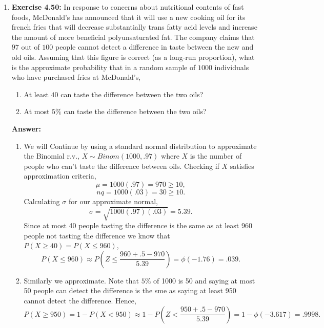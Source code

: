 \documentclass[12pt]{article}
\theoremstyle{homework}
\begin{document}
\begin{enumerate}
\item\hspace{.5in}\textbf{Exercise 4.50:} In response to concerns about nutritional contents of fast foods, McDonald’s has announced that it will use a new cooking oil for its french fries that will decrease substantially trans fatty acid levels and increase the amount of more beneficial polyunsaturated fat. The company claims that $97$ out of $100$ people cannot detect a difference in taste between the new and old oils. Assuming that this figure is correct (as a long-run proportion), what is the approximate probability that in a random sample of $1000$ individuals who have purchased fries at McDonald’s,
\begin{enumerate}
\item At least $40$ can taste the difference between the two oils?
\item At most $5\%$ can taste the difference between the two oils?
\end{enumerate}
\textbf{Answer:} 
\begin{enumerate}
\item We will Continue by using a standard normal distribution to approximate the Binomial r.v., $X \sim Binom(1000, .97)$ where $X$ is the number of people who can't taste the difference between oils. 
Checking if $X$ satisfies approximation criteria,
\begin{equation*}
  \mu = 1000(.97) = 970 \geq 10, 
\end{equation*}
\begin{equation*}
  nq = 1000(.03) = 30 \geq 10 .
\end{equation*}
Calculating $\sigma$ for our approximate normal,
\begin{equation*}
  \sigma = \sqrt{1000(.97)(.03)} = 5.39.
\end{equation*}
Since at most 40 people tasting the difference is the same as at least 960 people not tasting the difference we know that $P(X\geq 40) = P(X \le 960)$,
\begin{equation*}
  P(X \le 960) \approx P(Z \le \frac{960 + .5 - 970}{5.39}) = \phi(-1.76) = .039.
\end{equation*}
\item Similarly we approximate. Note that $5\%$ of 1000 is 50 and saying at most 50 people can detect the difference is the sme as saying at least 950 cannot detect the difference. Hence,
\begin{equation*}
  P(X \geq 950) = 1 - P(X < 950) \approx 1 - P(Z < \dfrac{950 + .5 - 970}{5.39}) = 1 - \phi(-3.617) = .9998.
\end{equation*}
\end{enumerate}
\vspace{.5in}





\end{enumerate}
\end{document}
